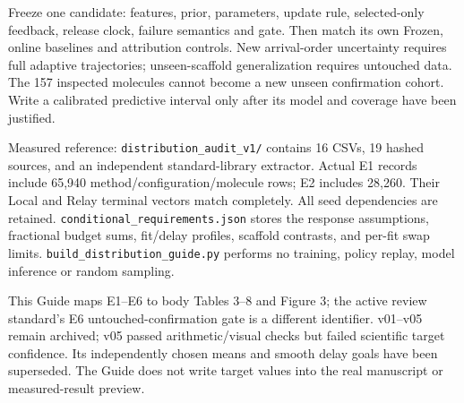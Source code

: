 \documentclass[10pt,letterpaper]{article}
\newcommand{\note}[1]{{\fontsize{8.5}{10.5}\selectfont #1\par}}
\newcommand{\sect}[1]{\vspace{5pt}{\large\bfseries #1}\par\vspace{2pt}}
\begin{document}
\sect{Before filling a prospective result matrix}
Freeze one candidate: features, prior, parameters, update rule, selected-only feedback, release clock,
failure semantics and gate. Then match its own Frozen, online baselines and attribution controls.
New arrival-order uncertainty requires full adaptive trajectories; unseen-scaffold generalization requires
untouched data. The 157 inspected molecules cannot become a new unseen confirmation cohort.
Write a calibrated predictive interval only after its model and coverage have been justified.

\sect{Evidence and reproducibility}
\note{\raggedright Measured reference: \texttt{distribution\_audit\_v1/} contains 16 CSVs, 19 hashed sources,
and an independent standard-library extractor. Actual E1 records include 65,940 method/configuration/molecule rows;
E2 includes 28,260. Their Local and Relay terminal vectors match completely.
All seed dependencies are retained. \texttt{conditional\_requirements.json} stores the response assumptions,
fractional budget sums, fit/delay profiles, scaffold contrasts, and per-fit swap limits.
\texttt{build\_distribution\_guide.py} performs no training, policy replay, model inference or random sampling.}

\note{This Guide maps E1--E6 to body Tables 3--8 and Figure 3; the active review standard's E6
untouched-confirmation gate is a different identifier. v01--v05 remain archived; v05 passed arithmetic/visual
checks but failed scientific target confidence. Its independently chosen means and smooth delay goals have
been superseded. The Guide does not write target values into the real manuscript or measured-result preview.}
\end{document}
